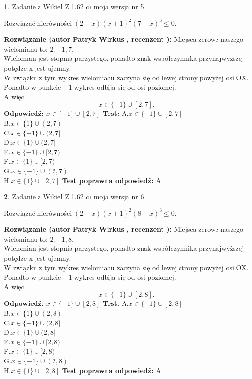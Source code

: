 \documentclass[12pt, a4paper]{article}
\theoremstyle{definition} %
\newtheorem{zad}{}
\newcommand{\zadStart}[1]{\begin{zad}#1\newline}
\newcommand{\zadStop}{\end{zad}}
\newcommand{\rozwStart}[2]{\noindent \textbf{Rozwiązanie (autor #1 , recenzent #2): }\newline}
\newcommand{\rozwStop}{\newline}
\newcommand{\odpStart}{\noindent \textbf{Odpowiedź:}\newline}
\newcommand{\odpStop}{\newline}
\newcommand{\testStart}{\noindent \textbf{Test:}\newline}
\newcommand{\testStop}{\newline}
\newcommand{\kluczStart}{\noindent \textbf{Test poprawna odpowiedź:}\newline}
\newcommand{\kluczStop}{\newline}
\begin{document}
\zadStart{Zadanie z Wikieł Z 1.62 c) moja wersja nr 5}

Rozwiązać nierówności $(2-x)(x+1)^{2}(7-x)^{3}\le0$.
\zadStop
\rozwStart{Patryk Wirkus}{}
Miejsca zerowe naszego wielomianu to: $2, -1, 7$.\\
Wielomian jest stopnia parzystego, ponadto znak współczynnika przy\linebreak najwyższej potędze x jest ujemny.\\ W związku z tym wykres wielomianu zaczyna się od lewej strony powyżej osi OX.\\
Ponadto w punkcie $-1$ wykres odbija się od osi poziomej.\\
A więc $$x \in \{-1\} \cup [2,7].$$
\rozwStop
\odpStart
$x \in \{-1\} \cup [2,7]$
\odpStop
\testStart
A.$x \in \{-1\} \cup [2,7]$\\
B.$x \in \{1\} \cup (2,7)$\\
C.$x \in \{-1\} \cup (2,7]$\\
D.$x \in \{1\} \cup (2,7]$\\
E.$x \in \{-1\} \cup [2,7)$\\
F.$x \in \{1\} \cup [2,7)$\\
G.$x \in \{-1\} \cup (2,7)$\\
H.$x \in \{1\} \cup [2,7]$
\testStop
\kluczStart
A
\kluczStop



\zadStart{Zadanie z Wikieł Z 1.62 c) moja wersja nr 6}

Rozwiązać nierówności $(2-x)(x+1)^{2}(8-x)^{3}\le0$.
\zadStop
\rozwStart{Patryk Wirkus}{}
Miejsca zerowe naszego wielomianu to: $2, -1, 8$.\\
Wielomian jest stopnia parzystego, ponadto znak współczynnika przy\linebreak najwyższej potędze x jest ujemny.\\ W związku z tym wykres wielomianu zaczyna się od lewej strony powyżej osi OX.\\
Ponadto w punkcie $-1$ wykres odbija się od osi poziomej.\\
A więc $$x \in \{-1\} \cup [2,8].$$
\rozwStop
\odpStart
$x \in \{-1\} \cup [2,8]$
\odpStop
\testStart
A.$x \in \{-1\} \cup [2,8]$\\
B.$x \in \{1\} \cup (2,8)$\\
C.$x \in \{-1\} \cup (2,8]$\\
D.$x \in \{1\} \cup (2,8]$\\
E.$x \in \{-1\} \cup [2,8)$\\
F.$x \in \{1\} \cup [2,8)$\\
G.$x \in \{-1\} \cup (2,8)$\\
H.$x \in \{1\} \cup [2,8]$
\testStop
\kluczStart
A
\kluczStop
\end{document}
